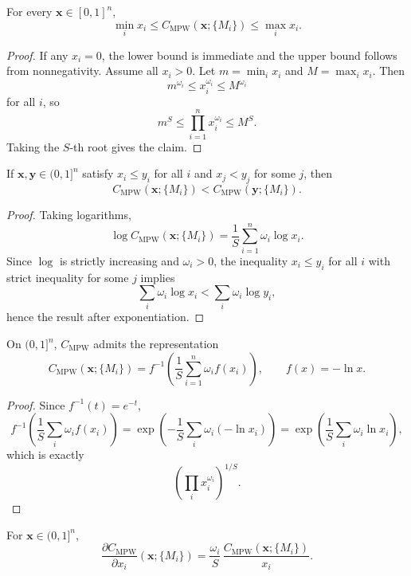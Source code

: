 \documentclass[11pt]{article}
\begin{document}
\begin{proposition}
\label{prop:compensation}
For every $\mathbf{x} \in [0,1]^n$,
\[
  \min_i x_i \le C_{\mathrm{MPW}}(\mathbf{x};\{M_i\}) \le \max_i x_i.
\]
\end{proposition}

\begin{proof}
If any $x_i=0$, the lower bound is immediate and the upper bound follows from nonnegativity. Assume all $x_i>0$. Let $m=\min_i x_i$ and $M=\max_i x_i$. Then
\[
  m^{\omega_i} \le x_i^{\omega_i} \le M^{\omega_i}
\]
for all $i$, so
\[
  m^{S} \le \prod_{i=1}^n x_i^{\omega_i} \le M^{S}.
\]
Taking the $S$-th root gives the claim.
\end{proof}

\begin{proposition}
\label{prop:monotonicity}
If $\mathbf{x},\mathbf{y}\in(0,1]^n$ satisfy $x_i \le y_i$ for all $i$ and $x_j < y_j$ for some $j$, then
\[
  C_{\mathrm{MPW}}(\mathbf{x};\{M_i\}) < C_{\mathrm{MPW}}(\mathbf{y};\{M_i\}).
\]
\end{proposition}

\begin{proof}
Taking logarithms,
\[
  \log C_{\mathrm{MPW}}(\mathbf{x};\{M_i\})
  = \frac{1}{S}\sum_{i=1}^n \omega_i \log x_i.
\]
Since $\log$ is strictly increasing and $\omega_i>0$, the inequality $x_i \le y_i$ for all $i$ with strict inequality for some $j$ implies
\[
  \sum_i \omega_i \log x_i < \sum_i \omega_i \log y_i,
\]
hence the result after exponentiation.
\end{proof}

\begin{proposition}
\label{prop:generator}
On $(0,1]^n$, $C_{\mathrm{MPW}}$ admits the representation
\[
  C_{\mathrm{MPW}}(\mathbf{x};\{M_i\})
  = f^{-1}\!\left(\frac{1}{S}\sum_{i=1}^n \omega_i f(x_i)\right),
\qquad
f(x) = -\ln x.
\]
\end{proposition}

\begin{proof}
Since $f^{-1}(t)=e^{-t}$,
\[
  f^{-1}\!\left(\frac{1}{S}\sum_i \omega_i f(x_i)\right)
  = \exp\!\left(-\frac{1}{S}\sum_i \omega_i(-\ln x_i)\right)
  = \exp\!\left(\frac{1}{S}\sum_i \omega_i \ln x_i\right),
\]
which is exactly
\[
  \left(\prod_i x_i^{\omega_i}\right)^{1/S}.
\]
\end{proof}

\begin{proposition}
\label{prop:gradient}
For $\mathbf{x}\in(0,1]^n$,
\[
  \frac{\partial C_{\mathrm{MPW}}}{\partial x_i}(\mathbf{x};\{M_i\})
  = \frac{\omega_i}{S}\,\frac{C_{\mathrm{MPW}}(\mathbf{x};\{M_i\})}{x_i}.
\]
\end{proposition}
\end{document}
